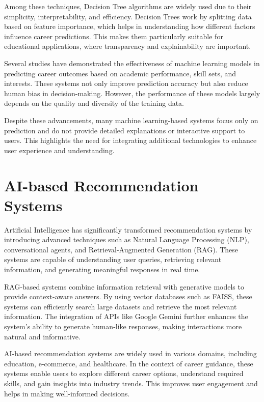\documentclass[12pt,a4paper]{report}
\begin{document}
{Among these techniques, Decision Tree algorithms are widely used due to their simplicity, interpretability, and efficiency. Decision Trees work by splitting data based on feature importance, which helps in understanding how different factors influence career predictions. This makes them particularly suitable for educational applications, where transparency and explainability are important.

Several studies have demonstrated the effectiveness of machine learning models in predicting career outcomes based on academic performance, skill sets, and interests. These systems not only improve prediction accuracy but also reduce human bias in decision-making. However, the performance of these models largely depends on the quality and diversity of the training data.

Despite these advancements, many machine learning-based systems focus only on prediction and do not provide detailed explanations or interactive support to users. This highlights the need for integrating additional technologies to enhance user experience and understanding.

\section{AI-based Recommendation Systems}

Artificial Intelligence has significantly transformed recommendation systems by introducing advanced techniques such as Natural Language Processing (NLP), conversational agents, and Retrieval-Augmented Generation (RAG). These systems are capable of understanding user queries, retrieving relevant information, and generating meaningful responses in real time.

RAG-based systems combine information retrieval with generative models to provide context-aware answers. By using vector databases such as FAISS, these systems can efficiently search large datasets and retrieve the most relevant information. The integration of APIs like Google Gemini further enhances the system’s ability to generate human-like responses, making interactions more natural and informative.

AI-based recommendation systems are widely used in various domains, including education, e-commerce, and healthcare. In the context of career guidance, these systems enable users to explore different career options, understand required skills, and gain insights into industry trends. This improves user engagement and helps in making well-informed decisions.

}
\end{document}
